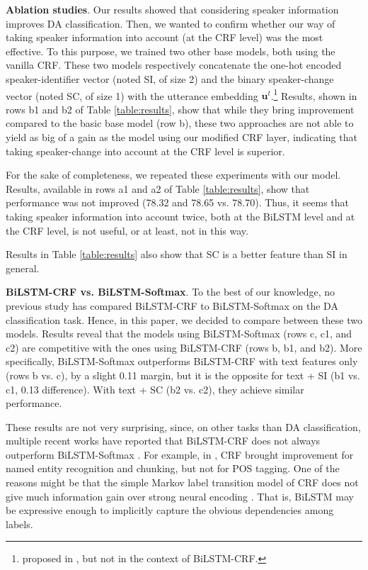 \documentclass[11pt,a4paper]{article}
\begin{document}
\noindent \textbf{Ablation studies}.
Our results showed that considering speaker information improves DA classification.
Then, we wanted to confirm whether our way of taking speaker information into account (at the CRF level) was the most effective.
To this purpose, we trained two other base models, both using the vanilla CRF.
These two models respectively concatenate the one-hot encoded speaker-identifier vector (noted SI, of size 2) and the binary speaker-change vector (noted SC, of size 1) with the utterance embedding $\mathbf{u}^t$.\footnote{proposed in \citep{liu-etal-2017-using-context,bothe-etal-2018-context}, but not in the context of BiLSTM-CRF.}
Results, shown in rows b1 and b2 of Table \ref{table:results}, show that while they bring improvement compared to the basic base model (row b), these two approaches are not able to yield as big of a gain as the model using our modified CRF layer, indicating that taking speaker-change into account at the CRF level is superior.

For the sake of completeness, we repeated these experiments with our model.
Results, available in rows a1 and a2 of Table \ref{table:results}, show that performance was not improved (78.32 and 78.65 vs. 78.70).
Thus, it seems that taking speaker information into account twice, both at the BiLSTM level and at the CRF level, is not useful, or at least, not in this way.

Results in Table \ref{table:results} also show that SC is a better feature than SI in general.

\noindent \textbf{BiLSTM-CRF vs. BiLSTM-Softmax}.
To the best of our knowledge, no previous study has compared BiLSTM-CRF to BiLSTM-Softmax on the DA classification task.
Hence, in this paper, we decided to compare between these two models.
Results reveal that the models using BiLSTM-Softmax (rows c, c1, and c2) are competitive with the ones using BiLSTM-CRF (rows b, b1, and b2).
More specifically, BiLSTM-Softmax outperforms BiLSTM-CRF with text features only (rows b vs. c), by a slight 0.11 margin, but it is the opposite for text + SI (b1 vs. c1, 0.13 difference).
With text + SC (b2 vs. c2), they achieve similar performance.

These results are not very surprising, since, on other tasks than DA classification,  multiple recent works have reported that BiLSTM-CRF does not always outperform  BiLSTM-Softmax \citep{reimers2017optimal,yang2018design,cui2019hierarchically}.
For example, in \cite{yang2018design}, CRF brought improvement for named entity recognition and chunking, but not for POS tagging. 
One of the reasons might be that the simple Markov label transition model of CRF does not give much information gain over strong neural encoding \citep{cui2019hierarchically}.
That is, BiLSTM may be expressive enough to implicitly capture the obvious dependencies among labels.
\end{document}
